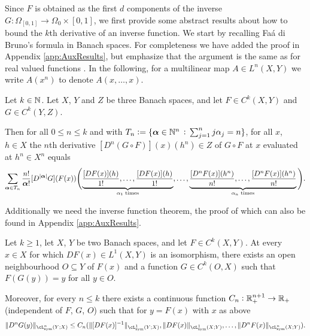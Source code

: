   Since $F$ is obtained as the first $d$ components of the inverse
  $G:\Omega_{[0,1]}\to\Omega_0\times [0,1]$, we first provide some
  abstract results about %
  how to bound the $k$th derivative of an inverse function. We start
  by recalling Fa\'{a} di Bruno's formula in Banach spaces. For
  completeness we have added the proof in Appendix \ref{app:AuxResults}, but emphasize
  that the argument is the same as for real valued functions \cite{}. In the
  following, for a multilinear map $A\in L^n(X,Y)$ we write $A(x^n)$
  to denote $A(x,\dots,x)$.

  \begin{theorem}[Fa\'{a} di Bruno]\label{thm:FdB}
    Let $k\in\mathbb{N}$.
  Let $X$, $Y$ and $Z$ be three Banach spaces, and let
  $F\in C^k(X,Y)$ and $G\in C^k(Y,Z)$.

  Then for all $0\le n\le k$ and with
  $T_n := \{{\boldsymbol \alpha} \in\mathbb{N}^n\, :\,\sum_{j=1}^n j\alpha_j =
    n \}$, %
  for all $x$, $h\in X$ the $n$th derivative
  $[D^n(G\circ F)](x)(h^n)\in Z$ of $G\circ F$ at $x$ evaluated at
  $h^n\in X^n$ equals
  \begin{equation*}
     \sum_{\bsalpha\in T_n}%
    \frac{n!}{\bsalpha!}
    [D^{|\bsalpha|}G](F(x)) \Bigg(\smash[b]{\underbrace{\frac{[DF(x)](h)}{1!},\ldots, \frac{[DF(x)](h)}{1!}}_{\text{$\alpha_1$ times}}},\ldots,\underbrace{\frac{[D^{n}F(x)](h^n)}{n!},\ldots, \frac{[D^{n}F(x)](h^n)}{n!}}_{\text{$\alpha_n$ times}}\Bigg).
  \end{equation*}

\end{theorem}
Additionally we need the inverse function theorem, the proof of which can also be found in Appendix \ref{app:AuxResults}. 
\begin{theorem}\label{thm:invfunc}
  Let $k\ge 1$, let $X$, $Y$ be two Banach spaces, and let $F\in C^k(X,Y)$.
  At every $x\in X$ for which $DF(x)\in L^1(X,Y)$ is an isomorphism,
  there exists an open neighbourhood $O\subseteq Y$ of $F(x)$ and a function
  $G\in C^k(O,X)$ such that $F(G(y))=y$ for all $y\in O$.

  Moreover, for every $n\le k$ there exists a continuous function
  $C_n:\mathbb{R}_+^{n+1}\to \mathbb{R}_+$ (independent of $F$, $G$, $O$) such
  that for $y=F(x)$ with $x$ as above
  \begin{equation}\label{eq:Cn}
    \|D^n G(y)\|_{\cL^n_{\sym}(Y;X)} \le C_n(\|[DF(x)]^{-1}\|_{\cL^1_{\sym}(Y;X)}, \|DF(x)\|_{\cL^1_{\sym}(X;Y)}, \ldots, \|D^nF(x)\|_{\cL^n_{\sym}(X;Y)}).
  \end{equation}
\end{theorem}

